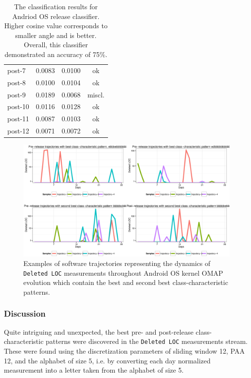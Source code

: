 {\begin{table}[t!]
{{\begin{minipage}[b]{0.47\hsize}
\begin{tabular}{l c c c}
post-7 & 0.0083 & 0.0100 & ok\\
post-8 & 0.0100 & 0.0104 & ok\\
post-9 & 0.0189 & 0.0068 & miscl.\\
post-10& 0.0116& 0.0128& ok\\
post-11& 0.0087 & 0.0103&  ok\\
post-12& 0.0071 & 0.0072&  ok\\
\hline
\end{tabular}
\end{minipage}%
\caption{The classification results for Andriod OS release classifier. Higher cosine value corresponds to smaller angle 
and is better. Overall, this classifier demonstrated an accuracy of 75\%.}
\label{android_table3}
}}
\end{table}
\begin{figure}[h!]
   \centering
   \includegraphics[width=145mm]{figures/omap_deleted_lines_patterns_plot.eps}
   \caption{Examples of software trajectories representing the dynamics of \texttt{Deleted LOC} measurements throughout Android OS kernel OMAP evolution which contain the best and second best class-characteristic patterns.}
   \label{fig:OMAP_patterns}
\end{figure}
} %

\subsubsection{Discussion}
Quite intriguing and unexpected, the best pre- and post-release class-characteristic patterns were discovered in the \texttt{Deleted LOC} measurements stream. These were found using the discretization parameters of sliding window 12, PAA 12, and the alphabet of size 5, i.e. by converting each day normalized measurement into a letter taken from the alphabet of size 5. 

